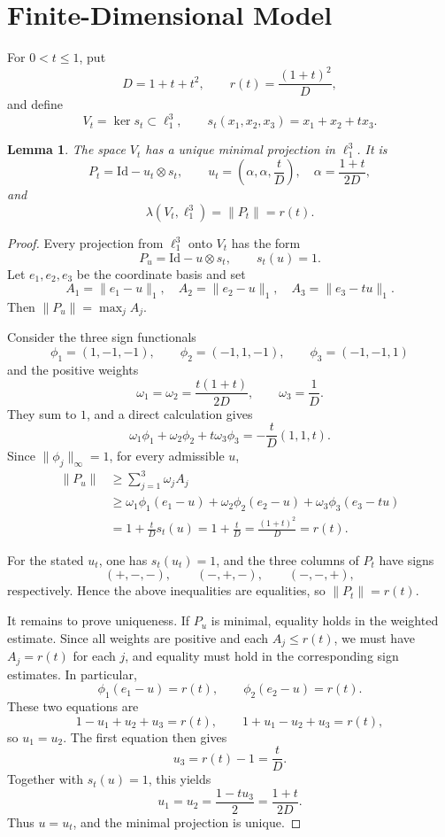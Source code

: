 \documentclass[11pt]{article}
\newtheorem{lemma}{Lemma}
\newcommand{\Id}{\mathrm{Id}}
\begin{document}
\section*{Finite-Dimensional Model}

For \(0<t\leq 1\), put
\[
  D=1+t+t^2,\qquad
  r(t)=\frac{(1+t)^2}{D},
\]
and define
\[
  V_t=\ker s_t\subset \ell_1^3,\qquad
  s_t(x_1,x_2,x_3)=x_1+x_2+t x_3.
\]

\begin{lemma}
\label{lem:finite}
The space \(V_t\) has a unique minimal projection in \(\ell_1^3\).  It is
\[
  P_t=\Id-u_t\otimes s_t,\qquad
  u_t=\left(\alpha,\alpha,\frac{t}{D}\right),
  \quad
  \alpha=\frac{1+t}{2D},
\]
and
\[
  \lambda(V_t,\ell_1^3)=\|P_t\|=r(t).
\]
\end{lemma}

\begin{proof}
Every projection from \(\ell_1^3\) onto \(V_t\) has the form
\[
  P_u=\Id-u\otimes s_t,\qquad s_t(u)=1.
\]
Let \(e_1,e_2,e_3\) be the coordinate basis and set
\[
  A_1=\|e_1-u\|_1,\quad
  A_2=\|e_2-u\|_1,\quad
  A_3=\|e_3-tu\|_1.
\]
Then \(\|P_u\|=\max_j A_j\).

Consider the three sign functionals
\[
  \phi_1=(1,-1,-1),\qquad
  \phi_2=(-1,1,-1),\qquad
  \phi_3=(-1,-1,1)
\]
and the positive weights
\[
  \omega_1=\omega_2=\frac{t(1+t)}{2D},\qquad
  \omega_3=\frac{1}{D}.
\]
They sum to \(1\), and a direct calculation gives
\[
  \omega_1\phi_1+\omega_2\phi_2+t\omega_3\phi_3
  =-\frac{t}{D}(1,1,t).
\]
Since \(\|\phi_j\|_{\infty}=1\), for every admissible \(u\),
\[
\begin{aligned}
  \|P_u\|
  &\geq \sum_{j=1}^3 \omega_j A_j                                      \\
  &\geq
  \omega_1\phi_1(e_1-u)+\omega_2\phi_2(e_2-u)+\omega_3\phi_3(e_3-tu)       \\
  &=1+\frac{t}{D}s_t(u)
  =1+\frac{t}{D}
  =\frac{(1+t)^2}{D}
  =r(t).
\end{aligned}
\]

For the stated \(u_t\), one has \(s_t(u_t)=1\), and the three columns of
\(P_t\) have signs
\[
  (+,-,-),\qquad (-,+,-),\qquad (-,-,+),
\]
respectively.  Hence the above inequalities are equalities, so
\(\|P_t\|=r(t)\).

It remains to prove uniqueness.  If \(P_u\) is minimal, equality holds in the
weighted estimate.  Since all weights are positive and each \(A_j\leq r(t)\),
we must have \(A_j=r(t)\) for each \(j\), and equality must hold in the
corresponding sign estimates.  In particular,
\[
  \phi_1(e_1-u)=r(t),\qquad \phi_2(e_2-u)=r(t).
\]
These two equations are
\[
  1-u_1+u_2+u_3=r(t),\qquad
  1+u_1-u_2+u_3=r(t),
\]
so \(u_1=u_2\).  The first equation then gives
\[
  u_3=r(t)-1=\frac{t}{D}.
\]
Together with \(s_t(u)=1\), this yields
\[
  u_1=u_2=\frac{1-tu_3}{2}
  =\frac{1+t}{2D}.
\]
Thus \(u=u_t\), and the minimal projection is unique.
\end{proof}
\end{document}
